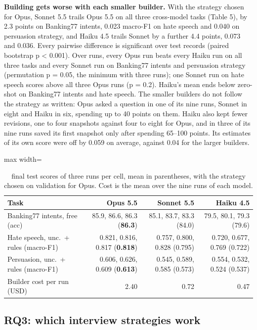 \documentclass[11pt]{article}
\begin{document}
\textbf{Building gets worse with each smaller builder.} With the strategy chosen for Opus, Sonnet 5.5 trails Opus 5.5 on all three cross-model tasks (Table 5), by 2.3 points on Banking77 intents, 0.023 macro-F1 on hate speech and 0.040 on persuasion strategy, and Haiku 4.5 trails Sonnet by a further 4.4 points, 0.073 and 0.036. Every pairwise difference is significant over test records (paired bootstrap p < 0.001). Over runs, every Opus run beats every Haiku run on all three tasks and every Sonnet run on Banking77 intents and persuasion strategy (permutation p = 0.05, the minimum with three runs); one Sonnet run on hate speech scores above all three Opus runs (p = 0.2). Haiku's mean ends below zero-shot on Banking77 intents and hate speech. The smaller builders do not follow the strategy as written: Opus asked a question in one of its nine runs, Sonnet in eight and Haiku in six, spending up to 40 points on them. Haiku also kept fewer revisions, one to four snapshots against four to eight for Opus, and in three of its nine runs saved its first snapshot only after spending 65--100 points. Its estimates of its own score were off by 0.059 on average, against 0.04 for the larger builders.

\begin{table}[t]
\centering\small
\begin{adjustbox}{max width=\linewidth}
\begin{tabular}{lrrr}
\toprule
Task & Opus 5.5 & Sonnet 5.5 & Haiku 4.5 \\
\midrule
Banking77 intents, free (acc) & 85.9, 86.6, 86.3 (\textbf{86.3}) & 85.1, 83.7, 83.3 (84.0) & 79.5, 80.1, 79.3 (79.6) \\
Hate speech, unc.\ + rules (macro-F1) & 0.821, 0.816, 0.817 (\textbf{0.818}) & 0.757, 0.800, 0.828 (0.795) & 0.720, 0.677, 0.769 (0.722) \\
Persuasion, unc.\ + rules (macro-F1) & 0.606, 0.626, 0.609 (\textbf{0.613}) & 0.545, 0.589, 0.585 (0.573) & 0.554, 0.532, 0.524 (0.537) \\
Builder cost per run (USD) & 2.40 & 0.72 & 0.47 \\
\bottomrule
\end{tabular}
\end{adjustbox}
\caption{final test scores of three runs per cell, mean in parentheses, with the strategy chosen on validation for Opus. Cost is the mean over the nine runs of each model.}
\label{tab:5}
\end{table}

\subsection{RQ3: which interview strategies work}
\end{document}
